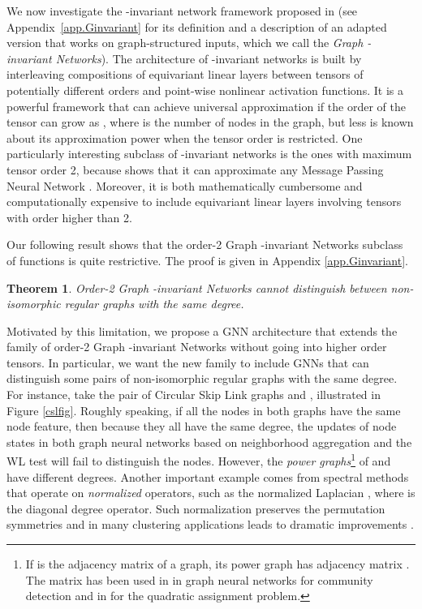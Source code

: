 \documentclass{article}
\newtheorem{theorem}{Theorem}
\begin{document}
We now investigate the -invariant network framework proposed in \cite{maron2019universality} (see Appendix~\ref{app.Ginvariant} for its definition and a description of an adapted version that works on graph-structured inputs, which we call the \textit{Graph -invariant Networks}). The architecture of -invariant networks is built by interleaving compositions of equivariant linear layers between tensors of potentially different orders and point-wise nonlinear activation functions. It is a powerful framework that can achieve universal approximation
if the order of the tensor can grow as , where  is the number of nodes in the graph, but less is known about its approximation power when the tensor order is restricted. One particularly interesting subclass of -invariant networks is the ones with maximum tensor order 2, because \cite{maron2018invariant} shows that it can approximate any Message Passing Neural Network \cite{gilmer2017neural}. Moreover, it is both mathematically cumbersome and computationally expensive to include equivariant linear layers involving tensors with order higher than 2.

Our following result shows that the order-2 Graph -invariant Networks subclass of functions is quite restrictive. The proof is given in Appendix \ref{app.Ginvariant}. 

\begin{theorem} \label{prop.Ginvariant}
Order-2 Graph -invariant Networks cannot distinguish between non-isomorphic regular graphs with the same degree.
\end{theorem}



Motivated by this limitation, we propose a GNN architecture that extends the family of order-2 Graph -invariant Networks without going into higher order tensors. In particular, we want the new family to include GNNs that can distinguish some pairs of non-isomorphic regular graphs with the same degree. For instance, take 
the pair of Circular Skip Link graphs  and , illustrated in Figure \ref{cslfig}.
Roughly speaking, if all the nodes in both graphs have the same node feature, then because they all have the same degree, the updates of node states in both graph neural networks based on neighborhood aggregation and the WL test will fail to distinguish the nodes. However, the \textit{power graphs}\footnote{If  is the adjacency matrix of a graph, its power graph has adjacency matrix . The matrix  has been used in \cite{chen2019cdsbm} in graph neural networks for community detection and in \cite{nowak2017note} for the quadratic assignment problem.} of  and  have different degrees. 
Another important example comes from spectral methods that operate on \emph{normalized} operators, such as the normalized Laplacian , where  is the diagonal degree operator. Such normalization preserves the permutation symmetries and in many clustering applications leads to dramatic improvements \cite{von2007tutorial}. 
\end{document}
